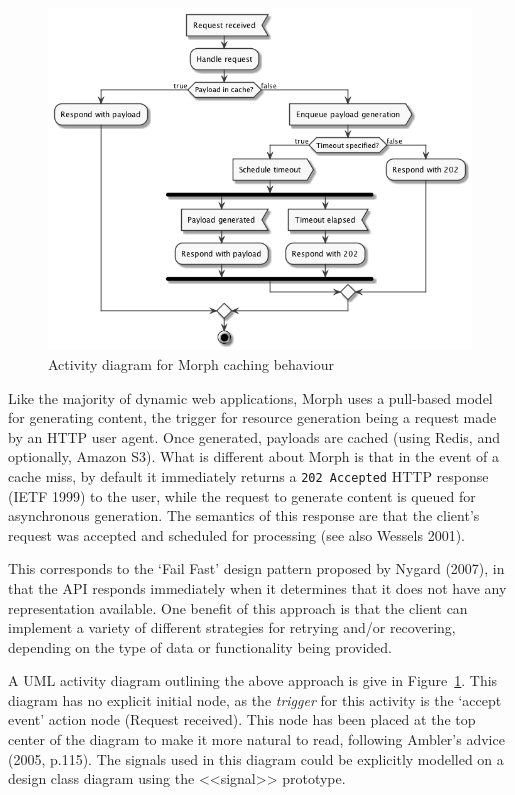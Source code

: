 \documentclass[a4paper]{article}
\begin{document}
\begin{figure}
  \begin{center}
    \includegraphics[width=\textwidth]{activity.png}
  \end{center}
  \caption{Activity diagram for Morph caching behaviour}
  \label{activity-diag}
\end{figure}

Like the majority of dynamic web applications, Morph uses a pull-based model for generating content, the trigger for resource generation being a request made by an HTTP user agent. Once generated, payloads are cached (using Redis, and optionally, Amazon S3). What is different about Morph is that in the event of a cache miss, by default it immediately returns a \texttt{202 Accepted} HTTP response (IETF 1999) to the user, while the request to generate content is queued for asynchronous generation. The semantics of this response are that the client's request was accepted and scheduled for processing (see also Wessels 2001).

This corresponds to the `Fail Fast' design pattern proposed by Nygard (2007), in that the API responds immediately when it determines that it does not have any representation available. One benefit of this approach is that the client can implement a variety of different strategies for retrying and/or recovering, depending on the type of data or functionality being provided.

A UML activity diagram outlining the above approach is give in Figure~\ref{activity-diag}. This diagram has no explicit initial node, as the \textit{trigger} for this activity is the `accept event' action node (\textsf{Request received}). This node has been placed at the top center of the diagram to make it more natural to read, following Ambler's advice (2005, p.115). The signals used in this diagram could be explicitly modelled on a design class diagram using the \textsf{<<signal>>} prototype.
\end{document}
